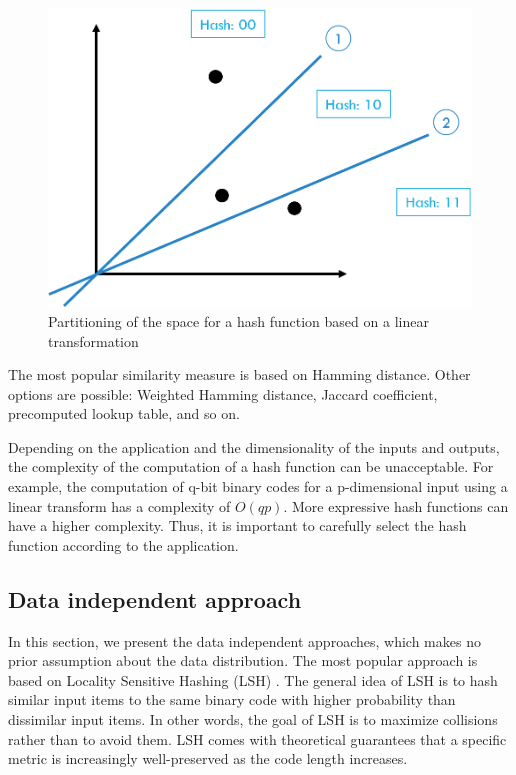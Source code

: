 \begin{figure}
	\includegraphics[width=\linewidth]{lsh.png}
	\caption{Partitioning of the space for a hash function based on a linear transformation}
	\label{fig:lsh}
\end{figure}

The most popular similarity measure is based on Hamming distance. Other options are possible: Weighted Hamming distance, Jaccard coefficient, precomputed lookup table, and so on.

Depending on the application and the dimensionality of the inputs and outputs, the complexity of the computation of a hash function can be unacceptable. For example, the computation of q-bit binary codes for a p-dimensional input using a linear transform has a complexity of $O(qp)$. More expressive hash functions can have a higher complexity. Thus, it is important to carefully select the hash function according to the application.

\subsection{Data independent approach}
In this section, we present the data independent approaches, which makes no prior assumption about the data distribution. The most popular approach is based on Locality Sensitive Hashing (LSH) \cite{DBLP:journals/corr/WangSSJ14}. The general idea of LSH is to hash similar input items to the same binary code with higher probability than dissimilar input items. In other words, the goal of LSH is to maximize collisions rather than to avoid them. LSH comes with theoretical guarantees that a specific metric is increasingly well-preserved as the code length increases.

